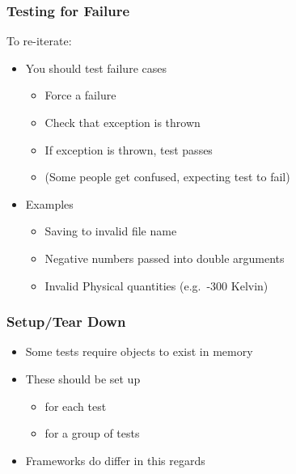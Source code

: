 \hypertarget{testing-for-failure}{%
\subsubsection{Testing for Failure}\label{testing-for-failure}}

To re-iterate:

\begin{itemize}
\tightlist
\item
  You should test failure cases

  \begin{itemize}
  \tightlist
  \item
    Force a failure
  \item
    Check that exception is thrown
  \item
    If exception is thrown, test passes
  \item
    (Some people get confused, expecting test to fail)
  \end{itemize}
\item
  Examples

  \begin{itemize}
  \tightlist
  \item
    Saving to invalid file name
  \item
    Negative numbers passed into double arguments
  \item
    Invalid Physical quantities (e.g.~-300 Kelvin)
  \end{itemize}
\end{itemize}

\hypertarget{setuptear-down}{%
\subsubsection{Setup/Tear Down}\label{setuptear-down}}

\begin{itemize}
\tightlist
\item
  Some tests require objects to exist in memory
\item
  These should be set up

  \begin{itemize}
  \tightlist
  \item
    for each test
  \item
    for a group of tests
  \end{itemize}
\item
  Frameworks do differ in this regards
\end{itemize}

